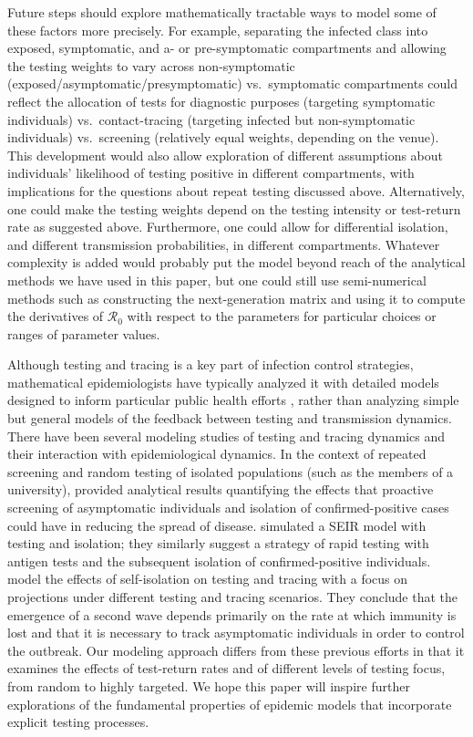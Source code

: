 \documentclass[smallextended]{svjour3}       %
\newcommand{\Rnum}{\ensuremath{\mathcal{R}_0}\xspace}
\DeclareRobustCommand\_{\ifmmode\expandafter\subtxt\else\textunderscore\fi}
\begin{document}
Future steps should explore mathematically tractable ways to model some of these factors more precisely. For example, separating the infected class into exposed, symptomatic, and a- or pre-symptomatic compartments and allowing the testing weights to vary across non-symptomatic (exposed\slash asymptomatic\slash presymptomatic) vs.\ symptomatic compartments could reflect the allocation of tests for diagnostic purposes (targeting symptomatic individuals) vs.\ contact-tracing (targeting infected but non-symptomatic individuals) vs.\ screening (relatively equal weights, depending on the venue). This development would also allow exploration of different assumptions about individuals' likelihood of testing positive in different compartments, with implications for the questions about repeat testing discussed above. Alternatively, one could make the testing weights depend on the testing intensity or test-return rate as suggested above. Furthermore, one could allow for differential isolation, and different transmission probabilities, in different compartments. Whatever complexity is added would probably put the model beyond reach of the analytical methods we have used in this paper, but one could still use semi-numerical methods such as constructing the next-generation matrix and using it to compute the derivatives of $\Rnum$ with respect to the parameters for particular choices or ranges of parameter values.

Although testing and tracing is a key part of infection control strategies, mathematical epidemiologists have typically analyzed it with detailed models designed to inform particular public health efforts \citep{endo2020implication,hellewell2020feasibility,jenness2021modeling}, rather than analyzing simple but general models of the feedback between testing and transmission dynamics.
There have been several modeling studies of testing and tracing dynamics and their interaction with epidemiological dynamics. In the context of repeated screening and random testing of isolated populations (such as the members of a university), \cite{bergstrom2020frequency} provided analytical results quantifying the effects that proactive screening of asymptomatic individuals and isolation of confirmed-positive cases could have in reducing the spread of disease. 
\cite{rogers2021high} simulated a SEIR model with testing and isolation; they similarly suggest a strategy of rapid testing with antigen tests and the subsequent isolation of confirmed-positive individuals.
\cite{friston2021testing} model the effects of self-isolation on testing and tracing with a focus on projections under different testing and tracing scenarios. They conclude that the emergence of a second wave depends primarily on the rate at which immunity is lost and that it is necessary to track asymptomatic individuals in order to control the outbreak. 
Our modeling approach differs from these previous efforts in that it examines the effects of test-return rates and of different levels of testing focus, from random to highly targeted. We hope this paper will inspire further explorations of the fundamental properties of epidemic models that incorporate explicit testing processes.
\end{document}
